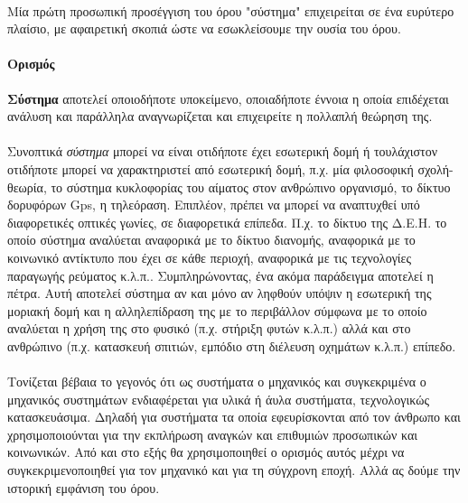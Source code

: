 \documentclass[a4paper,12pt,twoside]{report}
\begin{document}
			\paragraph{}{Μία πρώτη προσωπική προσέγγιση του όρου "σύστημα" επιχειρείται σε ένα ευρύτερο πλαίσιο, με αφαιρετική σκοπιά ώστε να εσωκλείσουμε την ουσία του όρου.
			}
			\paragraph{Ορισμός\label{ΟρισμόςΣυστήματος(Αφαιρετικός)}}{\textbf{Σύστημα} αποτελεί οποιοδήποτε υποκείμενο, οποιαδήποτε έννοια η οποία επιδέχεται ανάλυση και παράλληλα αναγνωρίζεται και επιχειρείτε η πολλαπλή θεώρηση της.
			}
			\paragraph{}{Συνοπτικά \textit{σύστημα} μπορεί να είναι οτιδήποτε έχει εσωτερική δομή ή τουλάχιστον οτιδήποτε μπορεί να χαρακτηριστεί από εσωτερική δομή, π.χ. μία φιλοσοφική σχολή-θεωρία, το σύστημα κυκλοφορίας του αίματος στον ανθρώπινο οργανισμό, το δίκτυο δορυφόρων Gps, η τηλεόραση. Επιπλέον, πρέπει να μπορεί να αναπτυχθεί υπό διαφορετικές οπτικές γωνίες, σε διαφορετικά επίπεδα. Π.χ. το δίκτυο της Δ.Ε.Η. το οποίο σύστημα αναλύεται αναφορικά με το δίκτυο διανομής, αναφορικά με το κοινωνικό αντίκτυπο που έχει σε κάθε περιοχή, αναφορικά με τις τεχνολογίες παραγωγής ρεύματος κ.λ.π.. Συμπληρώνοντας, ένα ακόμα παράδειγμα αποτελεί η πέτρα. Αυτή αποτελεί σύστημα αν και μόνο αν ληφθούν υπόψιν η εσωτερική της μοριακή δομή και η αλληλεπίδραση της με το περιβάλλον σύμφωνα με το οποίο αναλύεται η χρήση της στο φυσικό (π.χ. στήριξη φυτών κ.λ.π.) αλλά και στο ανθρώπινο (π.χ. κατασκευή σπιτιών, εμπόδιο στη διέλευση οχημάτων κ.λ.π.) επίπεδο.
			}
			
			\paragraph{}{Τονίζεται βέβαια το γεγονός ότι ως συστήματα ο μηχανικός και συγκεκριμένα ο μηχανικός συστημάτων ενδιαφέρεται για υλικά ή άυλα συστήματα, τεχνολογικώς κατασκευάσιμα. Δηλαδή για συστήματα τα οποία εφευρίσκονται από τον άνθρωπο και χρησιμοποιούνται για την εκπλήρωση αναγκών και επιθυμιών προσωπικών και κοινωνικών. Από και στο εξής θα χρησιμοποιηθεί ο ορισμός αυτός μέχρι να συγκεκριμενοποιηθεί για τον μηχανικό και για τη σύγχρονη εποχή. Αλλά ας δούμε την ιστορική εμφάνιση του όρου.
			}
		
\end{document}
